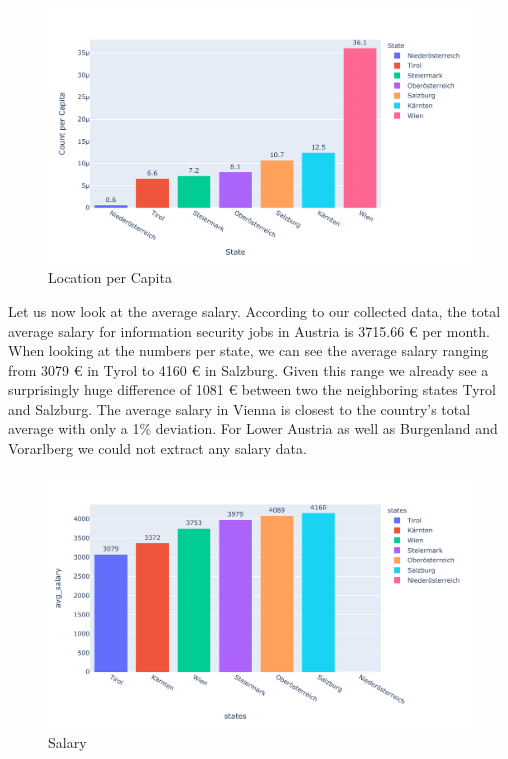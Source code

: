 \documentclass[runningheads]{llncs}
\begin{document}
\begin{figure}[H]
	\centering
  \includegraphics[width=\textwidth]{location-per-capita-bar-chart.pdf}
	\caption{Location per Capita}
	\label{fig:location_per_capita_chart}
\end{figure}

Let us now look at the average salary. According to our collected data, the total average salary for information security jobs in Austria is 3715.66 € per month. When looking at the numbers per state, we can see the average salary ranging from 3079 € in Tyrol to 4160 € in Salzburg. Given this range we already see a surprisingly huge difference of 1081 € between two the neighboring states Tyrol and Salzburg. The average salary in Vienna is closest to the country's total average with only a 1\% deviation. For Lower Austria as well as Burgenland and Vorarlberg we could not extract any salary data.

\begin{figure}[H]
	\centering
  \includegraphics[width=\textwidth]{average-salary-bar-chart.pdf}
	\caption{Salary}
	\label{fig:salary_chart}
\end{figure}
\end{document}

